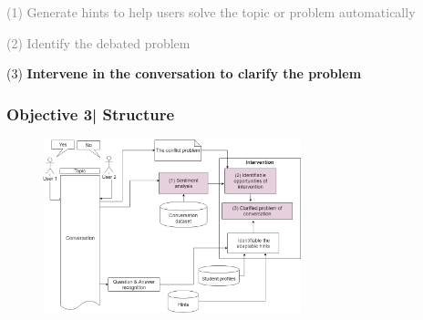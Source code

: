 \documentclass{beamer}
\begin{document}


\begin{frame}
\par 	\textcolor{gray}{(1)  Generate hints to help users solve the topic or problem automatically}
\par \textcolor{gray}{(2) Identify the debated  problem }
\par (3) \textbf{ Intervene in the conversation to clarify the problem }
\end{frame}
\begin{frame}
\frametitle{Objective 3| Structure}


\begin{figure}
	\includegraphics[width=75mm]{58.png}	
	
	
	

\end{figure}

\end{frame}
\end{document}
